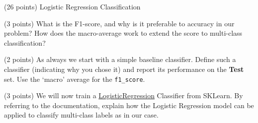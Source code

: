 \documentclass[12pt]{article}
\begin{document}

\begin{question}{(26 points) Logistic Regression Classification}
\label{Q_LR_NG}



\begin{subquestion}{(3 points) What is the F1-score, and why is it preferable to accuracy in our problem? How does the macro-average work to extend the score to multi-class classification?}






\end{subquestion}


\begin{subquestion}{(2 points) As always we start with a simple baseline classifier. Define such a classifier (indicating why you chose it) and report its performance on the \textbf{Test} set. Use the `macro' average for the \texttt{f1\_score}.} %






\end{subquestion}

\begin{subquestion}{(3 points) We will now train a \href{https://scikit-learn.org/stable/modules/generated/sklearn.linear_model.LogisticRegression.html}{LogisticRegression} Classifier from SKLearn. By referring to the documentation, explain how the Logistic Regression model can be applied to classify multi-class labels as in our case. }






\end{subquestion}


\end{question}
\end{document}
